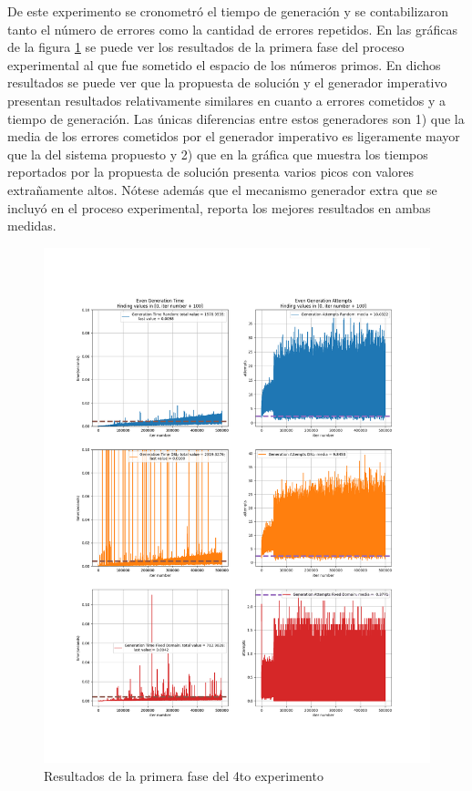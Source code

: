 De este experimento se cronometró el tiempo de generación y se contabilizaron tanto el número de errores como la
cantidad de errores repetidos.
En las gráficas de la figura \ref{fig:exp5} se puede ver los resultados de la primera fase del proceso experimental 
al que fue sometido el espacio de los números primos. En dichos resultados se puede ver que la propuesta de solución 
y el generador imperativo presentan resultados relativamente similares en cuanto a errores cometidos y a tiempo de 
generación. Las únicas diferencias entre estos generadores son 1) que la media de los errores cometidos por el generador 
imperativo es ligeramente mayor que la del sistema propuesto y 2) que en la gráfica que muestra los tiempos reportados por 
la propuesta de solución presenta varios picos con valores extrañamente altos. Nótese además que el mecanismo generador 
extra que se incluyó en el proceso experimental, reporta los mejores resultados en ambas medidas.

\begin{figure}[H]
      \includegraphics[width=\linewidth]{Graphics/exp5.png}
      \caption{Resultados de la primera fase del 4to experimento}
      \label{fig:exp5}
\end{figure}

